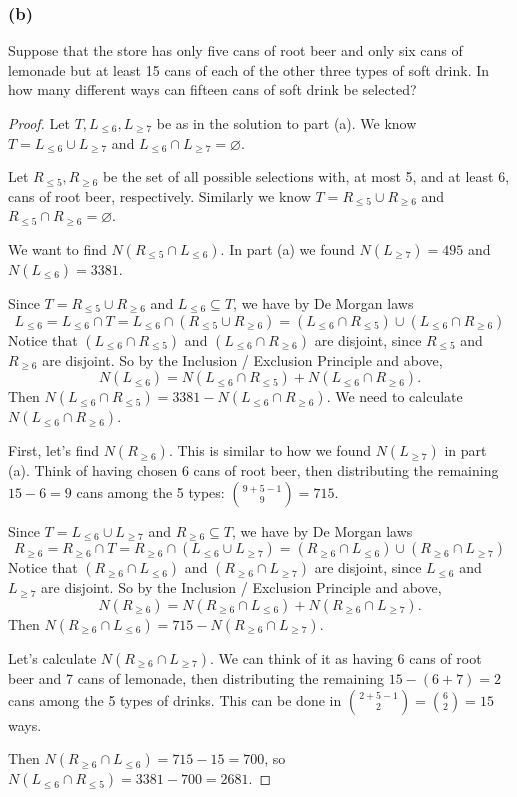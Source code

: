 \documentclass[14pt]{extarticle}
\newcommand{\es}{\varnothing}
\begin{document}
\subsubsection{(b)}
Suppose that the store has only five cans of root beer and only six cans of lemonade but at least 15 cans of each of the 
other three types of soft drink. In how many different ways can fifteen cans of soft drink be selected?

\begin{proof}
Let \(T, L_{\leq 6}, L_{\geq 7}\) be as in the solution to part (a). We know \(T = L_{\leq 6}\cup L_{\geq 7}\) and 
\(L_{\leq 6} \cap L_{\geq 7} = \es\).

Let \(R_{\leq 5}, R_{\geq 6}\) be the set of all possible selections with, at most 5, and at least 6, cans of root beer, 
respectively. Similarly we know \(T = R_{\leq 5}\cup R_{\geq 6}\) and \(R_{\leq 5} \cap R_{\geq 6} = \es\).

We want to find \(N(R_{\leq 5} \cap L_{\leq 6})\). In part (a) we found \(N(L_{\geq 7}) = 495\) and \(N(L_{\leq 6}) = 3381\).

Since \(T = R_{\leq 5} \cup R_{\geq 6}\) and \(L_{\leq 6} \subseteq T\), we have by De Morgan laws
\[
L_{\leq 6} = L_{\leq 6} \cap T = L_{\leq 6} \cap (R_{\leq 5} \cup R_{\geq 6}) = (L_{\leq 6} \cap R_{\leq 5}) \cup 
(L_{\leq 6} \cap R_{\geq 6})
\]
Notice that \((L_{\leq 6} \cap R_{\leq 5})\) and \((L_{\leq 6} \cap R_{\geq 6})\) are disjoint, since \(R_{\leq 5}\) and
\(R_{\geq 6}\) are disjoint. So by the Inclusion / Exclusion Principle and above,
\[
N(L_{\leq 6}) = N(L_{\leq 6} \cap R_{\leq 5}) + N(L_{\leq 6} \cap R_{\geq 6}).
\]
Then \(N(L_{\leq 6} \cap R_{\leq 5}) = 3381 - N(L_{\leq 6} \cap R_{\geq 6})\). We need to calculate \(N(L_{\leq 6} \cap 
R_{\geq 6})\). 

First, let's find \(N(R_{\geq 6})\). This is similar to how we found \(N(L_{\geq 7})\) in part (a). Think of having chosen 6
cans of root beer, then distributing the remaining \(15-6=9\) cans among the 5 types: \(\binom{9+5-1}{9} = 715\).

Since \(T = L_{\leq 6} \cup L_{\geq 7}\) and \(R_{\geq 6} \subseteq T\), we have by De Morgan laws
\[
R_{\geq 6} = R_{\geq 6} \cap T = R_{\geq 6} \cap (L_{\leq 6} \cup L_{\geq 7}) = (R_{\geq 6} \cap L_{\leq 6}) \cup 
(R_{\geq 6} \cap L_{\geq 7})
\]
Notice that \((R_{\geq 6} \cap L_{\leq 6})\) and \((R_{\geq 6} \cap L_{\geq 7})\) are disjoint, since \(L_{\leq 6}\) and
\(L_{\geq 7}\) are disjoint. So by the Inclusion / Exclusion Principle and above,
\[
N(R_{\geq 6}) = N(R_{\geq 6} \cap L_{\leq 6}) + N(R_{\geq 6} \cap L_{\geq 7}).
\]
Then \(N(R_{\geq 6} \cap L_{\leq 6}) = 715 - N(R_{\geq 6} \cap L_{\geq 7})\). 

Let's calculate \(N(R_{\geq 6} \cap L_{\geq 7})\). We can think of it as having 6 cans of root beer and 7 cans of 
lemonade, then distributing the remaining \(15-(6+7) = 2\) cans among the 5 types of drinks. This can be done in 
\(\binom{2+5-1}{2} = \binom{6}{2} = 15\) ways. 

Then \(N(R_{\geq 6} \cap L_{\leq 6}) = 715 - 15 = 700\), so \(N(L_{\leq 6} \cap R_{\leq 5}) = 3381 - 700 = 2681\).
\end{proof}
\end{document}
